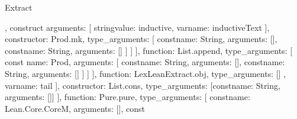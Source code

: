 \begin{lexlean}{Extract}
\begin{toolingmodule}
{{{{{{{{{{{{{{{{{{                                                        },
                                                        construct{
                                                          arguments: [
                                                            string{value: inductive},
                                                            var{name: inductiveText}
                                                          ],
                                                          constructor: Prod.mk,
                                                          type_arguments: [
                                                            const{name: String, arguments: []},
                                                            const{name: String, arguments: []}
                                                          ]
                                                        }
                                                      ]
                                                    }
                                                  ],
                                                  function: List.append,
                                                  type_arguments: [
                                                    const{
                                                      name: Prod,
                                                      arguments: [
                                                        const{name: String, arguments: []},
                                                        const{name: String, arguments: []}
                                                      ]
                                                    }
                                                  ]
                                                }
                                              ],
                                              function: LexLeanExtract.obj,
                                              type_arguments: []
                                            },
                                            var{name: tail}
                                          ],
                                          constructor: List.cons,
                                          type_arguments: [const{name: String, arguments: []}]
                                        }
                                      ],
                                      function: Pure.pure,
                                      type_arguments: [
                                        const{name: Lean.Core.CoreM, arguments: []},
                                        const{
}}}}}}}}}}}}}}
\end{toolingmodule}
\end{lexlean}
